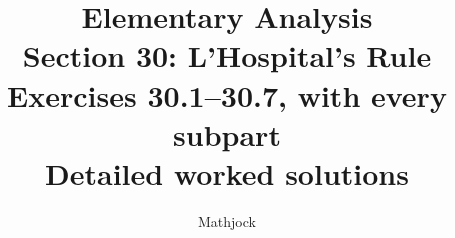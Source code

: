 
\title{\textbf{Elementary Analysis}\\[0.3em]
Section 30: L'Hospital's Rule\\[0.4em]
\large Exercises 30.1--30.7, with every subpart\\
Detailed worked solutions}
\author{Mathjock}
\date{}

\maketitle
\bookinfo
\tableofcontents
\clearpage
\setcounter{section}{29}


